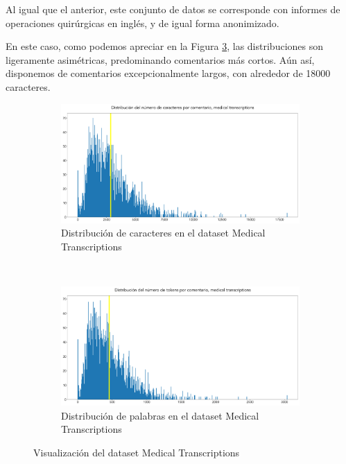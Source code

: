 Al igual que el anterior, este conjunto de datos se corresponde con informes de operaciones quirúrgicas en inglés, y de igual forma anonimizado.

En este caso, como podemos apreciar en la Figura \ref{fig:sum_mdtr}, las distribuciones son ligeramente asimétricas, predominando comentarios más cortos. Aún así, disponemos de comentarios excepcionalmente largos, con alrededor de 18000 caracteres.

\begin{figure}[h!]
	\centering
	\begin{subfigure}[t]{0.95\textwidth}
		\centering
		\includegraphics[width=.9\textwidth]{media/char_hist_mdtr.pdf}
		\caption{Distribución de caracteres en el dataset Medical Transcriptions}
		\label{fig:char_hist_mdtr}
	\end{subfigure}

	~
	\begin{subfigure}[t]{0.95\textwidth}
		\centering
		\includegraphics[width=.9\textwidth]{media/token_hist_mdtr.pdf}
		\caption{Distribución de palabras en el dataset Medical Transcriptions}
		\label{fig:token_hist_mdtr}
	\end{subfigure}

	\caption{Visualización del dataset Medical Transcriptions}
	\label{fig:sum_mdtr}
\end{figure}



